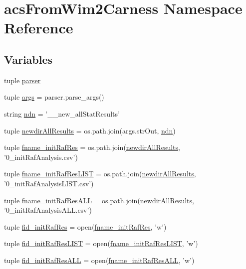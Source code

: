 \hypertarget{a00094}{\section{acs\-From\-Wim2\-Carness Namespace Reference}
\label{a00094}
}
\subsection*{Variables}
\begin{DoxyCompactItemize}
\item 
tuple \hyperlink{a00094_aed93287ef2c9a4a9ba68f8ffc75aae17}{parser}
\item 
tuple \hyperlink{a00094_ac4c461267ee7f11bbe525de64f56cd10}{args} = parser.\-parse\-\_\-args()
\item 
string \hyperlink{a00094_a6f995419ddd7f2de58506d9541238dbc}{ndn} = '\-\_\-\_\-new\-\_\-all\-Stat\-Results'
\item 
tuple \hyperlink{a00094_a4af2fb5abbd4a6e8930401e66af5b79d}{newdir\-All\-Results} = os.\-path.\-join(args.\-str\-Out, \hyperlink{a00094_a6f995419ddd7f2de58506d9541238dbc}{ndn})
\item 
tuple \hyperlink{a00094_a6df9226d812c675c76a936c215c07e53}{fname\-\_\-init\-Raf\-Res} = os.\-path.\-join(\hyperlink{a00094_a4af2fb5abbd4a6e8930401e66af5b79d}{newdir\-All\-Results}, '0\-\_\-init\-Raf\-Analysis.\-csv')
\item 
tuple \hyperlink{a00094_a69f06c42408f8a1ae74e34daa83402b7}{fname\-\_\-init\-Raf\-Res\-L\-I\-S\-T} = os.\-path.\-join(\hyperlink{a00094_a4af2fb5abbd4a6e8930401e66af5b79d}{newdir\-All\-Results}, '0\-\_\-init\-Raf\-Analysis\-L\-I\-S\-T.\-csv')
\item 
tuple \hyperlink{a00094_a89c98e628d7938077b4ed18215d4fd9b}{fname\-\_\-init\-Raf\-Res\-A\-L\-L} = os.\-path.\-join(\hyperlink{a00094_a4af2fb5abbd4a6e8930401e66af5b79d}{newdir\-All\-Results}, '0\-\_\-init\-Raf\-Analysis\-A\-L\-L.\-csv')
\item 
tuple \hyperlink{a00094_a2f9cfe05abfed3ab6326d0cb094c7c80}{fid\-\_\-init\-Raf\-Res} = open(\hyperlink{a00094_a6df9226d812c675c76a936c215c07e53}{fname\-\_\-init\-Raf\-Res}, 'w')
\item 
tuple \hyperlink{a00094_a7af2668de12720f3c7925527002d81b0}{fid\-\_\-init\-Raf\-Res\-L\-I\-S\-T} = open(\hyperlink{a00094_a69f06c42408f8a1ae74e34daa83402b7}{fname\-\_\-init\-Raf\-Res\-L\-I\-S\-T}, 'w')
\item 
tuple \hyperlink{a00094_add1c3bb75f1d98889c27099fc14fc6a8}{fid\-\_\-init\-Raf\-Res\-A\-L\-L} = open(\hyperlink{a00094_a89c98e628d7938077b4ed18215d4fd9b}{fname\-\_\-init\-Raf\-Res\-A\-L\-L}, 'w')

\end{DoxyCompactItemize}
